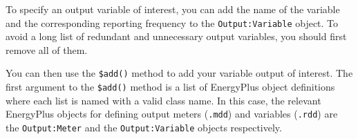 \documentclass[
]{book}
\newenvironment{Shaded}{\begin{snugshade}}{\end{snugshade}}
\newcommand{\ConstantTok}[1]{\textcolor[rgb]{0.00,0.00,0.00}{#1}}
\newcommand{\NormalTok}[1]{#1}
\newcommand{\OtherTok}[1]{\textcolor[rgb]{0.56,0.35,0.01}{#1}}
\newcommand{\SpecialCharTok}[1]{\textcolor[rgb]{0.00,0.00,0.00}{#1}}
\begin{document}
To specify an output variable of interest, you can add the name of the variable and the corresponding reporting frequency to the \texttt{Output:Variable} object. To avoid a long list of redundant and unnecessary output variables, you should first remove all of them.

\begin{Shaded}
\end{Shaded}

You can then use the \texttt{\$add()} method to add your variable output of interest. The first argument to the \texttt{\$add()} method is a list of EnergyPlus object definitions where each list is named with a valid class name. In this case, the relevant EnergyPlus objects for defining output meters (\texttt{.mdd}) and variables (\texttt{.rdd}) are the \texttt{Output:Meter} and the \texttt{Output:Variable} objects respectively.
\end{document}

